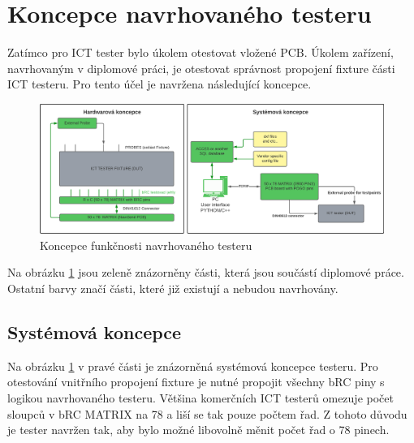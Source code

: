 \section{Koncepce navrhovaného testeru}
    Zatímco pro ICT tester bylo úkolem otestovat vložené PCB. Úkolem zařízení,
    navrhovaným v diplomové práci, je otestovat správnost propojení
    fixture části ICT testeru. Pro tento účel je navržena následující koncepce.

    \begin{figure}[ht!]
        \centering
        \includegraphics[width = 1\textwidth]{obrazky/system_connection_and_fixture.png}
        \caption{Koncepce funkčnosti navrhovaného testeru}
        \label{fig:Koncepce funkce}
    \end{figure}

    Na obrázku \ref{fig:Koncepce funkce} jsou zeleně znázorněny části, která jsou součástí diplomové práce.
    Ostatní barvy značí části, které již existují a nebudou navrhovány.

    \subsection{Systémová koncepce}
    Na obrázku \ref{fig:Koncepce funkce} v pravé části je znázorněná systémová koncepce testeru.
    Pro otestování vnitřního propojení fixture je nutné propojit všechny bRC piny s logikou navrhovaného testeru.
    Většina komerčních ICT testerů omezuje počet sloupců v bRC MATRIX na 78 a liší se tak pouze počtem řad.
    Z tohoto důvodu je tester navržen tak, aby bylo možné libovolně  měnit počet řad o 78 pinech\cite{ICT_guidline}.
    

